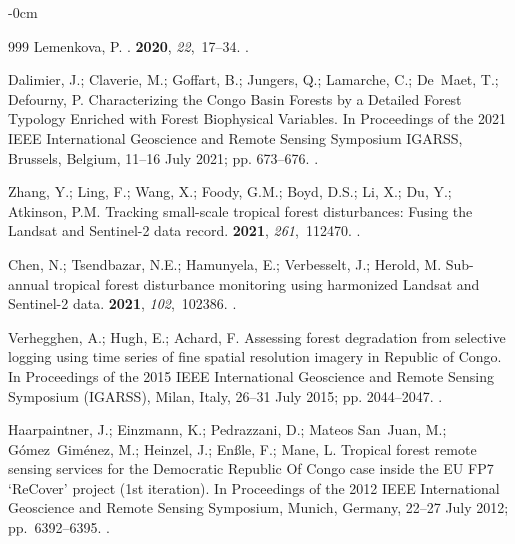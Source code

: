 \documentclass[applsci,article,accept,pdftex,moreauthors]{Definitions/mdpi}
\begin{document}
\begin{adjustwidth}{-\extralength}{0cm}
\begin{thebibliography}{999}
Lemenkova, P.
.
  {\bf 2020}, {\em 22},~17--34.
.

Dalimier, J.; Claverie, M.; Goffart, B.; Jungers, Q.; Lamarche, C.; De~Maet,
  T.; Defourny, P.
\newblock Characterizing the Congo Basin Forests by a Detailed Forest Typology
  Enriched with Forest Biophysical Variables.
\newblock In Proceedings of the 2021 IEEE International Geoscience and Remote
  Sensing Symposium IGARSS,  {Brussels, Belgium, 11--16 July 2021;}  pp. 673--676.
.

Zhang, Y.; Ling, F.; Wang, X.; Foody, G.M.; Boyd, D.S.; Li, X.; Du, Y.;
  Atkinson, P.M.
\newblock Tracking small-scale tropical forest disturbances: Fusing the Landsat
  and Sentinel-2 data record.
 {\bf 2021}, {\em 261},~112470.
.

Chen, N.; Tsendbazar, N.E.; Hamunyela, E.; Verbesselt, J.; Herold, M.
\newblock Sub-annual tropical forest disturbance monitoring using harmonized
  Landsat and Sentinel-2 data.
 {\bf 2021}, {\em 102},~102386.
.

Verhegghen, A.; Hugh, E.; Achard, F.
\newblock Assessing forest degradation from selective logging using time series
  of fine spatial resolution imagery in Republic of Congo.
\newblock In Proceedings of the 2015 IEEE International Geoscience and Remote
  Sensing Symposium (IGARSS), {Milan, Italy, 26--31 July 2015;}  pp. 2044--2047.
.

Haarpaintner, J.; Einzmann, K.; Pedrazzani, D.; Mateos San~Juan, M.;
  Gómez~Giménez, M.; Heinzel, J.; Enßle, F.; Mane, L.
\newblock Tropical forest remote sensing services for the Democratic Republic
  Of Congo case inside the EU FP7 ‘ReCover’ project (1st iteration).
\newblock In Proceedings of the 2012 IEEE International Geoscience and Remote
  Sensing Symposium, {Munich, Germany, 22--27 July  2012;}  pp.~6392--6395.
.


\end{thebibliography}
\end{adjustwidth}
\end{document}
